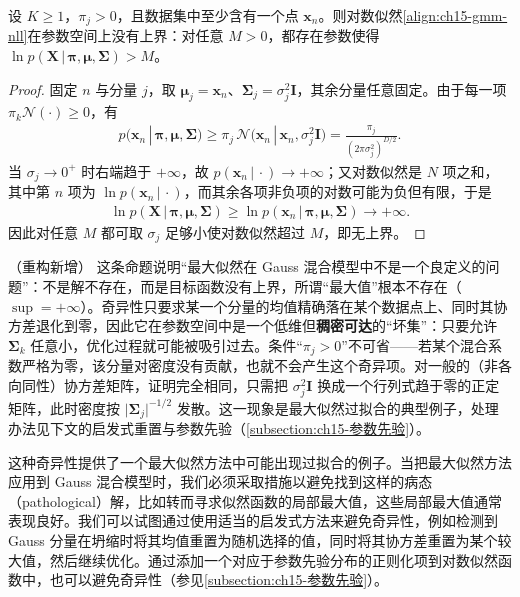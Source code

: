 \documentclass[../../main.tex]{subfiles}
\begin{document}
\begin{proposition}[似然函数的奇异性]\label{proposition:ch15-似然奇异性}
设 $K\geqslant1$，$\pi_j>0$，且数据集中至少含有一个点 $\bm{x}_n$。则对数似然\eqref{align:ch15-gmm-nll}在参数空间上没有上界：对任意 $M>0$，都存在参数使得 $\ln p(\bm{X}\,|\,\bm{\pi},\bm{\mu},\bm{\Sigma})>M$。
\end{proposition}
\begin{proof}
固定 $n$ 与分量 $j$，取 $\bm{\mu}_j=\bm{x}_n$、$\bm{\Sigma}_j=\sigma_j^2\bm{I}$，其余分量任意固定。由于每一项 $\pi_k\mathcal{N}(\cdot)\geqslant0$，有
\begin{align*}
p(\bm{x}_n\,|\,\bm{\pi},\bm{\mu},\bm{\Sigma})
\geqslant\pi_j\,\mathcal{N}\big(\bm{x}_n\,|\,\bm{x}_n,\sigma_j^2\bm{I}\big)
=\frac{\pi_j}{(2\pi\sigma_j^2)^{D/2}}.
\end{align*}
当 $\sigma_j\to0^{+}$ 时右端趋于 $+\infty$，故 $p(\bm{x}_n\,|\,\cdot)\to+\infty$；又对数似然是 $N$ 项之和，其中第 $n$ 项为 $\ln p(\bm{x}_n\,|\,\cdot)$，而其余各项非负项的对数可能为负但有限，于是
\begin{align*}
\ln p(\bm{X}\,|\,\bm{\pi},\bm{\mu},\bm{\Sigma})\geqslant\ln p(\bm{x}_n\,|\,\bm{\pi},\bm{\mu},\bm{\Sigma})\longrightarrow+\infty.
\end{align*}
因此对任意 $M$ 都可取 $\sigma_j$ 足够小使对数似然超过 $M$，即无上界。
\end{proof}

\begin{remark}（重构新增）
这条命题说明“最大似然在 Gauss 混合模型中不是一个良定义的问题”：不是解不存在，而是目标函数没有上界，所谓“最大值”根本不存在（$\sup=+\infty$）。奇异性只要求某一个分量的均值精确落在某个数据点上、同时其协方差退化到零，因此它在参数空间中是一个低维但\textbf{稠密可达}的“坏集”：只要允许 $\bm{\Sigma}_k$ 任意小，优化过程就可能被吸引过去。条件“$\pi_j>0$”不可省——若某个混合系数严格为零，该分量对密度没有贡献，也就不会产生这个奇异项。对一般的（非各向同性）协方差矩阵，证明完全相同，只需把 $\sigma_j^2\bm{I}$ 换成一个行列式趋于零的正定矩阵，此时密度按 $\lvert\bm{\Sigma}_j\rvert^{-1/2}$ 发散。这一现象是最大似然过拟合的典型例子，处理办法见下文的启发式重置与参数先验（\cref{subsection:ch15-参数先验}）。
\end{remark}

这种奇异性提供了一个最大似然方法中可能出现过拟合的例子。当把最大似然方法应用到 Gauss 混合模型时，我们必须采取措施以避免找到这样的病态（pathological）解，比如转而寻求似然函数的局部最大值，这些局部最大值通常表现良好。我们可以试图通过使用适当的启发式方法来避免奇异性，例如检测到 Gauss 分量在坍缩时将其均值重置为随机选择的值，同时将其协方差重置为某个较大值，然后继续优化。通过添加一个对应于参数先验分布的正则化项到对数似然函数中，也可以避免奇异性（参见\cref{subsection:ch15-参数先验}）。
\end{document}

